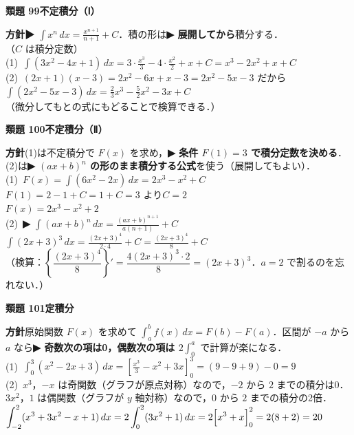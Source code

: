 \documentclass[a4paper,11pt]{ltjsarticle}
\newcommand{\ans}[2]{\Needspace{5\baselineskip}\vspace{6pt}%
  {\sffamily\bfseries 類題 #1\quad #2}\par}
\newcommand{\point}[1]{\textsf{\bfseries ▶ #1}}
\begin{document}
\ans{99}{不定積分（Ⅰ）}
\begin{kai}
\textbf{方針}\quad \point{$\displaystyle\int x^n\,dx=\frac{x^{n+1}}{n+1}+C$}．積の形は\point{展開してから}積分する．\\[2pt]
（$C$ は積分定数）\\
(1)\ $\displaystyle\int(3x^2-4x+1)\,dx=3\cdot\frac{x^3}3-4\cdot\frac{x^2}2+x+C=x^3-2x^2+x+C$\\[2pt]
(2)\ $(2x+1)(x-3)=2x^2-6x+x-3=2x^2-5x-3$ だから\\
\hspace*{1.5em}$\displaystyle\int(2x^2-5x-3)\,dx=\frac23x^3-\frac52x^2-3x+C$\\
\hspace*{1.5em}（微分してもとの式にもどることで検算できる．）
\end{kai}

\ans{100}{不定積分（Ⅱ）}
\begin{kai}
\textbf{方針}\quad (1)は不定積分で $F(x)$ を求め，\point{条件 $F(1)=3$ で積分定数を決める}．(2)は\point{$(ax+b)^n$ の形のまま積分する公式}を使う（展開してもよい）．\\[2pt]
(1)\ $F(x)=\displaystyle\int(6x^2-2x)\,dx=2x^3-x^2+C$\\
\hspace*{1.5em}$F(1)=2-1+C=1+C=3$ より\quad $C=2$\\
\hspace*{1.5em}$F(x)=2x^3-x^2+2$\\[2pt]
(2)\ \point{$\displaystyle\int(ax+b)^n\,dx=\frac{(ax+b)^{n+1}}{a(n+1)}+C$}\\
\hspace*{1.5em}$\displaystyle\int(2x+3)^3\,dx=\frac{(2x+3)^4}{2\cdot4}+C=\frac{(2x+3)^4}{8}+C$\\
\hspace*{1.5em}（検算：$\left\{\dfrac{(2x+3)^4}{8}\right\}'=\dfrac{4(2x+3)^3\cdot2}{8}=(2x+3)^3$．$a=2$ で割るのを忘れない．）
\end{kai}

\ans{101}{定積分}
\begin{kai}
\textbf{方針}\quad 原始関数 $F(x)$ を求めて $\displaystyle\int_a^bf(x)\,dx=F(b)-F(a)$．区間が $-a$ から $a$ なら\point{奇数次の項は0，偶数次の項は $2\displaystyle\int_0^a$} で計算が楽になる．\\[2pt]
(1)\ $\displaystyle\int_0^3(x^2-2x+3)\,dx=\left[\frac{x^3}3-x^2+3x\right]_0^3=(9-9+9)-0=9$\\[2pt]
(2)\ $x^3$，$-x$ は奇関数（グラフが原点対称）なので，$-2$ から $2$ までの積分は0．\\
\hspace*{1.5em}$3x^2$，$1$ は偶関数（グラフが $y$ 軸対称）なので，$0$ から $2$ までの積分の2倍．\\
\hspace*{1.5em}$\displaystyle\int_{-2}^{2}(x^3+3x^2-x+1)\,dx=2\int_0^2(3x^2+1)\,dx=2\Bigl[x^3+x\Bigr]_0^2=2(8+2)=20$
\end{kai}
\end{document}
